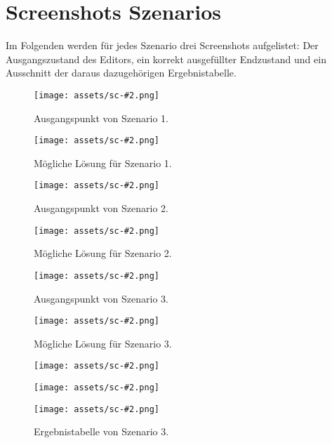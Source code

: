 \chapter{Screenshots Szenarios}
\label{app:scenarios}

Im Folgenden werden für jedes Szenario drei Screenshots aufgelistet: Der Ausgangszustand des Editors, ein korrekt ausgefüllter Endzustand und ein Ausschnitt der daraus dazugehörigen Ergebnistabelle.

\newcommand{\scgraphic}[3][]{%
  \texttt{[image: assets/sc-\#2.png]}
  #1
  \caption[#3]{#3.}}

\newcommand{\cscgraphic}[2]{%
  \scgraphic[\vspace{-10mm}]{#1}{#2}}

\newcommand{\scfigure}[2]{%
  \begin{figure}[hbtp]
    \centering
    \scgraphic{#1}{#2}
  \end{figure}}

\scfigure{1-start}{Ausgangspunkt von Szenario 1}
\scfigure{1-end}{Mögliche Lösung für Szenario 1}
\scfigure{2-start}{Ausgangspunkt von Szenario 2}
\scfigure{2-end}{Mögliche Lösung für Szenario 2}
\scfigure{3-start}{Ausgangspunkt von Szenario 3}
\scfigure{3-end}{Mögliche Lösung für Szenario 3}
\begin{figure}[hbtp]
  \centering
  \cscgraphic{1-result}{Ergebnistabelle von Szenario 1}
  \vspace{4mm}
  \cscgraphic{2-result}{Ergebnistabelle von Szenario 2}
  \vspace{4mm}
  \cscgraphic{3-result}{Ergebnistabelle von Szenario 3}
\end{figure}
